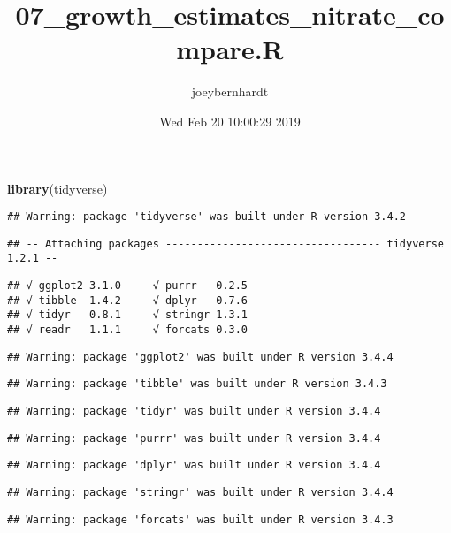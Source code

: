 \documentclass[]{article}
\title{07\_growth\_estimates\_nitrate\_compare.R}
\author{joeybernhardt}
\date{Wed Feb 20 10:00:29 2019}
\newenvironment{Shaded}{\begin{snugshade}}{\end{snugshade}}
\newcommand{\KeywordTok}[1]{\textcolor[rgb]{0.13,0.29,0.53}{\textbf{{#1}}}}
\newcommand{\NormalTok}[1]{{#1}}
\begin{document}
\maketitle

\begin{Shaded}
\begin{Highlighting}[]
\KeywordTok{library}\NormalTok{(tidyverse)}
\end{Highlighting}
\end{Shaded}

\begin{verbatim}
## Warning: package 'tidyverse' was built under R version 3.4.2
\end{verbatim}

\begin{verbatim}
## -- Attaching packages ---------------------------------- tidyverse 1.2.1 --
\end{verbatim}

\begin{verbatim}
## √ ggplot2 3.1.0     √ purrr   0.2.5
## √ tibble  1.4.2     √ dplyr   0.7.6
## √ tidyr   0.8.1     √ stringr 1.3.1
## √ readr   1.1.1     √ forcats 0.3.0
\end{verbatim}

\begin{verbatim}
## Warning: package 'ggplot2' was built under R version 3.4.4
\end{verbatim}

\begin{verbatim}
## Warning: package 'tibble' was built under R version 3.4.3
\end{verbatim}

\begin{verbatim}
## Warning: package 'tidyr' was built under R version 3.4.4
\end{verbatim}

\begin{verbatim}
## Warning: package 'purrr' was built under R version 3.4.4
\end{verbatim}

\begin{verbatim}
## Warning: package 'dplyr' was built under R version 3.4.4
\end{verbatim}

\begin{verbatim}
## Warning: package 'stringr' was built under R version 3.4.4
\end{verbatim}

\begin{verbatim}
## Warning: package 'forcats' was built under R version 3.4.3
\end{verbatim}
\end{document}
